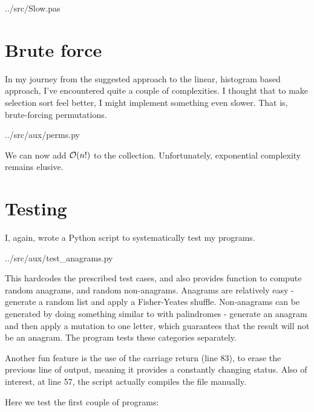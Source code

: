 \documentclass[fleqn,a4paper,11pt]{article}
\begin{document}

{../src/Slow.pas}

    \section{Brute force}

    In my journey from the suggested approach to the linear, histogram based
    approach, I've encountered quite a couple of complexities. I thought that to
    make selection sort feel better, I might implement something even slower.
    That is, brute-forcing permutations.


{../src/aux/perms.py}

    We can now add \(\operatorname{\mathcal O}(n!)\) to the collection. Unfortunately, exponential
    complexity remains elusive.

    \section{Testing}

    I, again, wrote a Python script to systematically test my programs.


{../src/aux/test_anagrams.py}

    This hardcodes the prescribed test cases, and also provides function to
    compute random anagrams, and random non-anagrams. Anagrams are relatively
    easy - generate a random list and apply a Fisher-Yeates shuffle.
    Non-anagrams can be generated by doing something similar to with palindromes
    - generate an anagram and then apply a mutation to one letter, which
    guarantees that the result will not be an anagram. The program tests these
    categories separately.

    Another fun feature is the use of the carriage return (line 83), to erase
    the previous line of output, meaning it provides a constantly changing
    status. Also of interest, at line 57, the script actually compiles the file
    manually.

    Here we test the first couple of programs:
\end{document}
